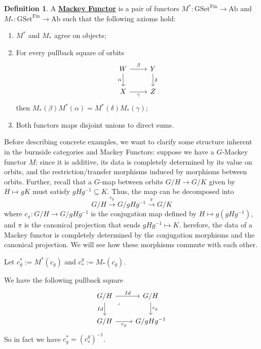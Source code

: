\documentclass{article}
\theoremstyle{definition}
\theoremstyle{definition}
\newtheorem{definition}{Definition}[theorem]
\theoremstyle{definition}
\theoremstyle{definition}
\theoremstyle{definition}
\theoremstyle{definition}
\theoremstyle{definition}
\begin{document}
\begin{tcolorbox}[colback=purple!5!white,colframe=purple!75!black]
    \begin{definition}
    A \underline{\textbf{Mackey Functor}} is a pair of functors $M^*: \textrm{GSet}^{\textrm{Fin}}\to \textrm{Ab}$ and $M_*: \textrm{GSet}^{\textrm{Fin}}\to \textrm{Ab}$ such that the following axioms hold:
    \begin{enumerate}
        \item $M^*$ and $M_*$ agree on objects;
        \item For every pullback square of orbits
        \[\begin{tikzcd}
            W & Y \\
            X & Z
            \arrow["\beta", from=1-1, to=1-2]
            \arrow["\alpha"', from=1-1, to=2-1]
            \arrow["\delta", from=1-2, to=2-2]
            \arrow["\gamma"', from=2-1, to=2-2]
        \end{tikzcd}\]
        then $M_*(\beta)M^*(\alpha)=M^*(\delta)M_*(\gamma)$;
        \item Both functors maps disjoint unions to direct sums. 
    \end{enumerate}
    \end{definition}
    \end{tcolorbox}
    


Before describing concrete examples, we want to clarify some structure inherent in the burnside categories and Mackey Functors: suppose we have a $G$-Mackey functor $\underline{M}$; since it is additive, its data is completely determined by its value on orbits, and the restriction/transfer morphisms induced by morphisms between orbits. Further, recall that a $G$-map between orbits $G/H\to G/K$ given by $H\mapsto gK$ must satisfy $gHg^{-1}\subseteq K$. Thus, the map can be decomposed into 
\[G/H\xrightarrow{c_{g}} G/gHg^{-1}\xrightarrow{\pi} G/K\] 
where $c_{x}: G/H\to G/gHg^{-1}$ is the conjugation map defined by $H\mapsto g(gHg^{-1})$, and $\pi$ is the canonical projection that sends $gHg^{-1}\mapsto K$. herefore, the data of a Mackey functor is completely determined by the conjugation morphisms and the canonical projection. We will see how these morphisms commute with each other.

Let $c_g^*:=M^*(c_g)$ and $c^g_*:=M_*(c_g)$. 

We have the following pullback square 
\[\begin{tikzcd}
	{G/H} & {G/H} \\
	{G/H} & {G/gHg^{-1}}
	\arrow["Id", from=1-1, to=1-2]
	\arrow["Id"', from=1-1, to=2-1]
	\arrow["\lrcorner"{anchor=center, pos=0.125}, draw=none, from=1-1, to=2-2]
	\arrow["{c_g}", from=1-2, to=2-2]
	\arrow["{c_g}"', from=2-1, to=2-2]
\end{tikzcd}\]
So in fact we have $c_g^*=(c^g_*)^{-1}$. 
\end{document}
